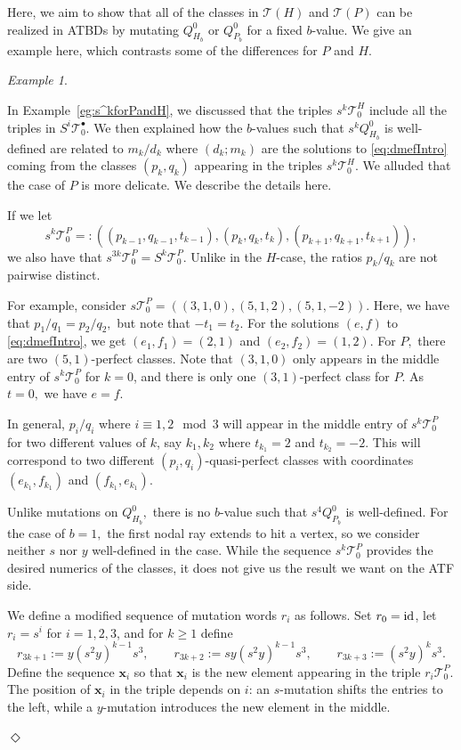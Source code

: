 \documentclass[11pt, reqno]{amsart}
\theoremstyle{remark}
\numberwithin{equation}{subsection}
\numberwithin{figure}{section}
\theoremstyle{customremark}
\newtheorem{example_no_diamond}[thm]{Example}
\newenvironment{example}{\begin{example_no_diamond} } {\hfill$\er$ \end{example_no_diamond}}
\newcommand{\id}{{\rm id}}
\newcommand{\Tt}{\mathcal{T}}
\newcommand{\er}{{\Diamond}}
\begin{document}
Here, we aim to show that all of the classes in $\Tt(H)$ and $\Tt(P)$ can be realized in ATBDs by mutating $Q_{H_b}^0$ or $Q_{P_b}^0$ for a fixed $b$-value. We give an example here, which contrasts some of the differences for $P$ and $H$. 


\begin{example} \label{eg:s^kforPandH2}


    In Example~\ref{eg:s^kforPandH}, we discussed that the triples $s^k\Tt_0^H$ include all the triples in $S^i\Tt_0^\bullet.$ We then explained how the $b$-values such that $s^kQ_{H_b}^0$ is well-defined are related to $m_k/d_k$ where $(d_k;m_k)$ are the solutions to \eqref{eq:dmefIntro} coming from the classes $(p_k,q_k)$ appearing in the triples $s^k\Tt_0^H.$ We alluded that the case of $P$ is more delicate. We describe the details here.  



    If we let 
 \[s^k\Tt_0^P=:\left((p_{k-1},q_{k-1},t_{k-1}),(p_{k},q_{k},t_{k}),(p_{k+1},q_{k+1},t_{k+1})\right),\] we also have that $s^{3k}\Tt_0^P=S^k\Tt_0^P.$ 
 Unlike in the $H$-case, the ratios $p_k/q_k$ are not pairwise distinct.

For example, consider $s\Tt_0^P=\left((3,1,0),(5,1,2),(5,1,-2)\right).$ Here, we have that $p_1/q_1=p_2/q_2,$ but note that $-t_1=t_2.$ For the solutions $(e,f)$ to \eqref{eq:dmefIntro}, we get $(e_1,f_1)=(2,1)$ and $(e_2,f_2)=(1,2).$ For $P,$ there are two $(5,1)$-perfect classes. Note that $(3,1,0)$ only appears in the middle entry of $s^k\Tt_0^P$ for $k=0$, and there is only one $(3,1)$-perfect class for $P.$ As $t=0,$ we have $e=f$. 
 
 
 In general, $p_i/q_i$ where $i \equiv 1,2 \mod{3}$ will appear in the middle entry of $s^k\Tt_0^P$ for two different values of $k$, say $k_1,k_2$ where $t_{k_1}=2$ and $t_{k_2}=-2.$ This will correspond to two different $(p_i,q_i)$-quasi-perfect classes with coordinates $(e_{k_1},f_{k_1})$ and $(f_{k_1},e_{k_1})$. 

 Unlike mutations on $Q_{H_b}^0,$ there is no $b$-value such that $s^4Q_{P_b}^0$ is well-defined. For the case of $b=1,$ the first nodal ray extends to hit a vertex, so we consider neither $s$ nor $y$ well-defined in the case. While the sequence $s^k\Tt_0^P$ provides the desired numerics of the classes, it does not give us the result we want on the ATF side. 

 We define a modified sequence of mutation words ${r_i}$ as follows. Set $r_0=\id$, let $r_i=s^i$ for $i=1,2,3$, and for $k\geq 1$ define
\begin{equation} \label{eq:SPsequence}
r_{3k+1}:=y(s^2y)^{k-1}s^3,\qquad
r_{3k+2}:=sy(s^2y)^{k-1}s^3,\qquad
r_{3k+3}:=(s^2y)^ks^3.
\end{equation}
Define the sequence $\bm{x}_i$ so that $\bm{x}_i$ is the new element appearing in the triple $r_i\Tt_0^P$. The position of $\bm{x}_i$ in the triple depends on $i$: an $s$-mutation shifts the entries to the left, while a $y$-mutation introduces the new element in the middle.


\end{example}
\end{document}
